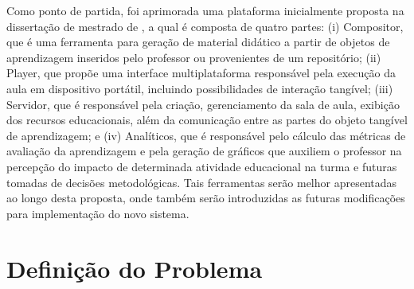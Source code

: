 
Como ponto de partida, foi aprimorada uma plataforma inicialmente proposta na dissertação de mestrado de \cite{leitao:2017}, a qual é composta de quatro partes: (i) Compositor, que é uma ferramenta para geração de material didático a partir de objetos de aprendizagem inseridos pelo professor ou provenientes de um repositório; (ii) Player, que propõe uma interface multiplataforma responsável pela execução da aula em dispositivo portátil, incluindo possibilidades de interação tangível; (iii) Servidor, que é responsável pela criação, gerenciamento da sala de aula, exibição dos recursos educacionais, além da comunicação entre as partes do objeto tangível de aprendizagem; e (iv) Analíticos, que é responsável pelo cálculo das métricas de avaliação da aprendizagem e pela geração de gráficos que auxiliem o professor na percepção do impacto de determinada atividade educacional na turma e futuras tomadas de decisões metodológicas. Tais ferramentas serão melhor apresentadas ao longo desta proposta, onde também serão introduzidas as futuras modificações para implementação do novo sistema.

\section{Definição do Problema}
\label{section:defProblem}

